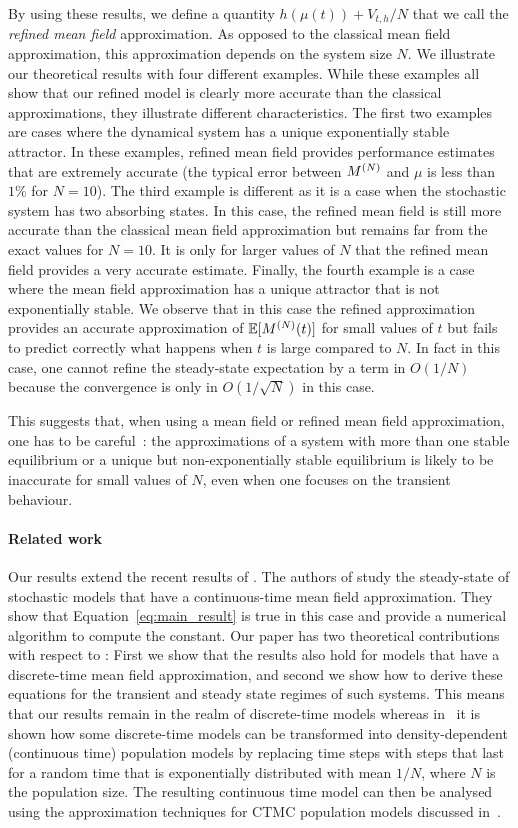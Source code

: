 \documentclass{amsart}
\begin{document}
By using these results, we define a quantity $h(\mu(t))+V_{t,h}/N$
that we call the \emph{refined mean field} approximation. As opposed
to the classical mean field approximation, this approximation depends
on the system size $N$. We illustrate our theoretical results with
four different examples. While these examples all show that our
refined model is clearly more accurate than the classical
approximations, they illustrate different characteristics. The first
two examples are cases where the dynamical system has a unique
exponentially stable attractor. In these examples, refined mean field
provides performance estimates that are extremely accurate (the
typical error between $M^{(N)}$ and $\mu$ is less than $1\%$ for
$N=10$). The third example is different as it is a case when the
stochastic system has two absorbing states. In this case, the refined
mean field is still more accurate than the classical mean field
approximation but remains far from the exact values for $N=10$.  It is
only for larger values of $N$ that the refined mean field provides a
very accurate estimate. Finally, the fourth example is a case where
the mean field approximation has a unique attractor that is not
exponentially stable. We observe that in this case the refined
approximation provides an accurate approximation of $\esp{\MN(t)}$ for
small values of $t$ but fails to predict correctly what happens when
$t$ is large compared to $N$. In fact in this case, one cannot refine
the steady-state expectation by a term in $O(1/N)$ because the
convergence is only in $O(1/\sqrt{N})$ in this case.

This suggests that, when using a mean field or refined mean field
approximation, one has to be careful~: the approximations of a system
with more than one stable equilibrium or a unique but
non-exponentially stable equilibrium is likely to be inaccurate for
small values of $N$, even when one focuses on the transient behaviour.

\paragraph*{Related work} Our results extend the recent results of
\cite{gast2017refined}. The authors of \cite{gast2017refined} study
the steady-state of stochastic models that have a continuous-time mean
field approximation. They show that Equation~\eqref{eq:main_result} is
true in this case and provide a numerical algorithm to compute the
constant. Our paper has two theoretical contributions with respect to
\cite{gast2017refined} : First we show that the results also hold for
models that have a discrete-time mean field approximation, and second
we show how to derive these equations for the transient and steady
state regimes of such systems.  This means that our results remain in
the realm of discrete-time models whereas in~\cite{gast2017refined} it
is shown how some discrete-time models can be transformed into
density-dependent (continuous time) population models by replacing
time steps with steps that last for a random time that is
exponentially distributed with mean $1/N$, where $N$ is the population
size. The resulting continuous time model can then be analysed using
the approximation techniques for CTMC population models discussed
in~\cite{gast2017refined}.
\end{document}

